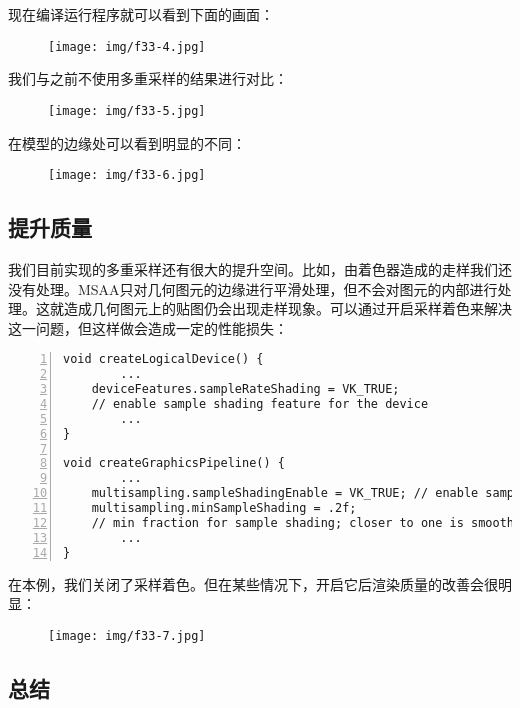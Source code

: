 \documentclass{ctexart}
\begin{document}
现在编译运行程序就可以看到下面的画面：

\begin{figure}[H]
	\centering
	\texttt{[image: img/f33-4.jpg]}
\end{figure}

我们与之前不使用多重采样的结果进行对比：

\begin{figure}[H]
	\centering
	\texttt{[image: img/f33-5.jpg]}
\end{figure}

在模型的边缘处可以看到明显的不同：

\begin{figure}[H]
	\centering
	\texttt{[image: img/f33-6.jpg]}
\end{figure}

\subsection{提升质量}

我们目前实现的多重采样还有很大的提升空间。比如，由着色器造成的走样我们还没有处理。MSAA只对几何图元的边缘进行平滑处理，但不会对图元的内部进行处理。这就造成几何图元上的贴图仍会出现走样现象。可以通过开启采样着色来解决这一问题，但这样做会造成一定的性能损失：

\begin{lstlisting}[language={[ANSI]C},keywordstyle=\color{blue!70},commentstyle=\color{red!50!green!50!blue!50},frame=shadowbox, rulesepcolor=\color{red!20!green!20!blue!20},basicstyle=\small,numbers=left, numberstyle=\tiny,breaklines=true]
void createLogicalDevice() {
		...
	deviceFeatures.sampleRateShading = VK_TRUE;
	// enable sample shading feature for the device
		...
}

void createGraphicsPipeline() {
		...
	multisampling.sampleShadingEnable = VK_TRUE; // enable sample shading in the pipeline
	multisampling.minSampleShading = .2f;
	// min fraction for sample shading; closer to one is smoother
		...
}
\end{lstlisting}

在本例，我们关闭了采样着色。但在某些情况下，开启它后渲染质量的改善会很明显：

\begin{figure}[H]
	\centering
	\texttt{[image: img/f33-7.jpg]}
\end{figure}

\subsection{总结}
\end{document}
